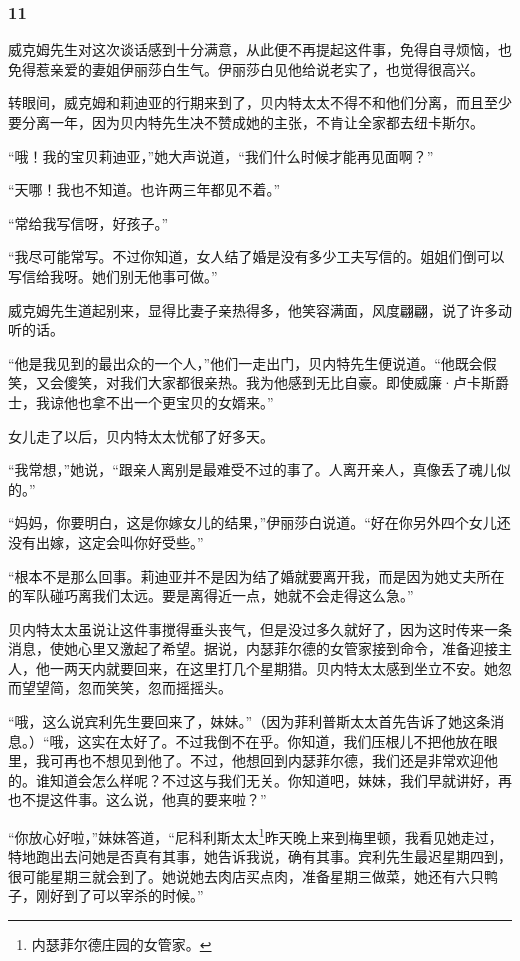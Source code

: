 \subsubsection*{11}

\par 威克姆先生对这次谈话感到十分满意，从此便不再提起这件事，免得自寻烦恼，也免得惹亲爱的妻姐伊丽莎白生气。伊丽莎白见他给说老实了，也觉得很高兴。
\par 转眼间，威克姆和莉迪亚的行期来到了，贝内特太太不得不和他们分离，而且至少要分离一年，因为贝内特先生决不赞成她的主张，不肯让全家都去纽卡斯尔。
\par “哦！我的宝贝莉迪亚，”她大声说道，“我们什么时候才能再见面啊？”
\par “天哪！我也不知道。也许两三年都见不着。”
\par “常给我写信呀，好孩子。”
\par “我尽可能常写。不过你知道，女人结了婚是没有多少工夫写信的。姐姐们倒可以写信给我呀。她们别无他事可做。”
\par 威克姆先生道起别来，显得比妻子亲热得多，他笑容满面，风度翩翩，说了许多动听的话。
\par “他是我见到的最出众的一个人，”他们一走出门，贝内特先生便说道。“他既会假笑，又会傻笑，对我们大家都很亲热。我为他感到无比自豪。即使威廉·卢卡斯爵士，我谅他也拿不出一个更宝贝的女婿来。”
\par 女儿走了以后，贝内特太太忧郁了好多天。
\par “我常想，”她说，“跟亲人离别是最难受不过的事了。人离开亲人，真像丢了魂儿似的。”
\par “妈妈，你要明白，这是你嫁女儿的结果，”伊丽莎白说道。“好在你另外四个女儿还没有出嫁，这定会叫你好受些。”
\par “根本不是那么回事。莉迪亚并不是因为结了婚就要离开我，而是因为她丈夫所在的军队碰巧离我们太远。要是离得近一点，她就不会走得这么急。”
\par 贝内特太太虽说让这件事搅得垂头丧气，但是没过多久就好了，因为这时传来一条消息，使她心里又激起了希望。据说，内瑟菲尔德的女管家接到命令，准备迎接主人，他一两天内就要回来，在这里打几个星期猎。贝内特太太感到坐立不安。她忽而望望简，忽而笑笑，忽而摇摇头。
\par “哦，这么说宾利先生要回来了，妹妹。”（因为菲利普斯太太首先告诉了她这条消息。）“哦，这实在太好了。不过我倒不在乎。你知道，我们压根儿不把他放在眼里，我可再也不想见到他了。不过，他想回到内瑟菲尔德，我们还是非常欢迎他的。谁知道会怎么样呢？不过这与我们无关。你知道吧，妹妹，我们早就讲好，再也不提这件事。这么说，他真的要来啦？”
\par “你放心好啦，”妹妹答道，“尼科利斯太太\footnote{内瑟菲尔德庄园的女管家。}昨天晚上来到梅里顿，我看见她走过，特地跑出去问她是否真有其事，她告诉我说，确有其事。宾利先生最迟星期四到，很可能星期三就会到了。她说她去肉店买点肉，准备星期三做菜，她还有六只鸭子，刚好到了可以宰杀的时候。”
